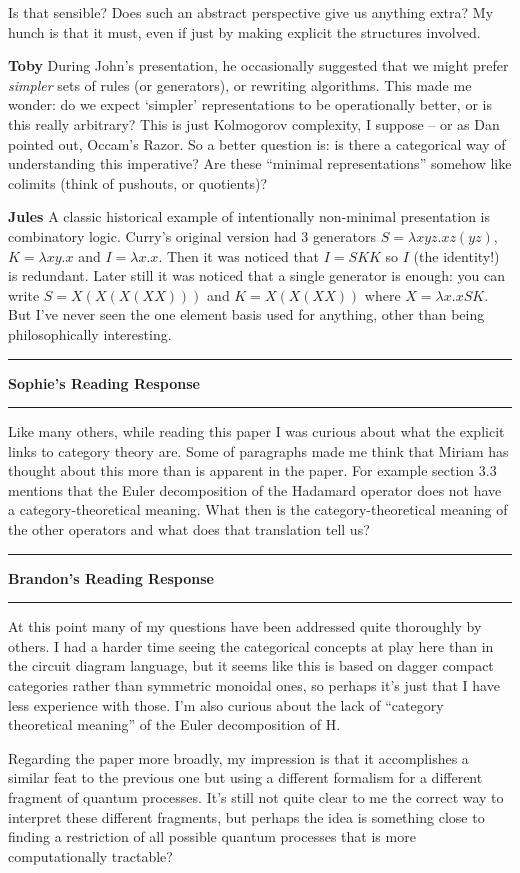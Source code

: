 \documentclass{amsart}
\newcommand{\iam}[1]{
  \vspace{0.25em}
  \hrule
  \vspace{0.25em}
  \textbf{{#1}'s Reading Response}
  \vspace{0.25em}
  \hrule
  \vspace{1em}
}
\newcommand{\respond}[1]{
  \vspace{1em} \textbf{#1}
}
\begin{document}
Is that sensible? Does such an abstract perspective give us anything
extra? My hunch is that it must, even if just by making explicit the
structures involved.

\respond{Toby} During John's presentation, he occasionally suggested
that we might prefer \textit{simpler} sets of rules (or generators),
or rewriting algorithms. This made me wonder: do we expect `simpler'
representations to be operationally better, or is this really
arbitrary? This is just Kolmogorov complexity, I suppose -- or
as Dan pointed out, Occam's Razor. So a better question is: is there a
categorical way of understanding this imperative? Are these ``minimal
representations'' somehow like colimits (think of pushouts, or
quotients)?

\respond{Jules} A classic historical example of intentionally non-minimal presentation is combinatory logic. Curry's original version had 3 generators $S = \lambda x y z . x z (y z)$, $K = \lambda x y . x$ and $I = \lambda x . x$. Then it was noticed that $I = SKK$ so $I$ (the identity!) is redundant. Later still it was noticed that a single generator is enough: you can write $S = X (X (X (XX)))$ and $K = X (X (XX))$ where $X = \lambda x . x S K$. But I've never seen the one element basis used for anything, other than being philosophically interesting.

\iam{Sophie}
Like many others, while reading this paper I was curious about what the explicit links to category theory are.
Some of paragraphs made me think that Miriam has thought about this more than is apparent in the paper.
For example section 3.3 mentions that the Euler decomposition of the Hadamard operator does not have a category-theoretical meaning. What then is the category-theoretical meaning of the other operators and what does that translation tell us?

\iam{Brandon}

At this point many of my questions have been addressed quite thoroughly by others.  I had a harder time seeing the categorical concepts at play here than in the circuit diagram language, but it seems like this is based on dagger compact categories rather than symmetric monoidal ones, so perhaps it's just that I have less experience with those.  I'm also curious about the lack of ``category theoretical meaning'' of the Euler decomposition of H.

Regarding the paper more broadly, my impression is that it accomplishes a similar feat to the previous one but using a different formalism for a different fragment of quantum processes.  It's still not quite clear to me the correct way to interpret these different fragments, but perhaps the idea is something close to finding a restriction of all possible quantum processes that is more computationally tractable?
\end{document}
